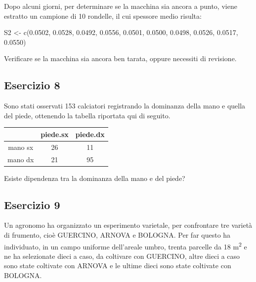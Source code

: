 \documentclass[a4paper,12pt,oneside]{book}
\newenvironment{Shaded}{\begin{snugshade}}{\end{snugshade}}
\newcommand{\FloatTok}[1]{#1}
\newcommand{\OtherTok}[1]{#1}
\newcommand{\FunctionTok}[1]{#1}
\newcommand{\NormalTok}[1]{#1}
\begin{document}
Dopo alcuni giorni, per determinare se la macchina sia ancora a punto, viene estratto un campione di 10 rondelle, il cui spessore medio risulta:

\begin{Shaded}
\begin{Highlighting}[]
\NormalTok{S2 }\OtherTok{\textless{}{-}} \FunctionTok{c}\NormalTok{(}\FloatTok{0.0502}\NormalTok{, }\FloatTok{0.0528}\NormalTok{, }\FloatTok{0.0492}\NormalTok{, }\FloatTok{0.0556}\NormalTok{, }\FloatTok{0.0501}\NormalTok{, }\FloatTok{0.0500}\NormalTok{, }\FloatTok{0.0498}\NormalTok{,}
        \FloatTok{0.0526}\NormalTok{, }\FloatTok{0.0517}\NormalTok{, }\FloatTok{0.0550}\NormalTok{)}
\end{Highlighting}
\end{Shaded}

Verificare se la macchina sia ancora ben tarata, oppure necessiti di revisione.

\hypertarget{esercizio-8-1}{%
\subsection{Esercizio 8}\label{esercizio-8-1}}

Sono stati osservati 153 calciatori registrando la dominanza della mano e quella del piede, ottenendo la tabella riportata qui di seguito.

\begin{longtable}[]{@{}ccc@{}}
\toprule()
& piede.sx & piede.dx \\
\midrule()
\endhead
mano sx & 26 & 11 \\
mano dx & 21 & 95 \\
\bottomrule()
\end{longtable}

Esiste dipendenza tra la dominanza della mano e del piede?

\hypertarget{esercizio-9-1}{%
\subsection{Esercizio 9}\label{esercizio-9-1}}

Un agronomo ha organizzato un esperimento varietale, per confrontare tre varietà di frumento, cioè GUERCINO, ARNOVA e BOLOGNA. Per far questo ha individuato, in un campo uniforme dell'areale umbro, trenta parcelle da 18 m\textsuperscript{2} e ne ha selezionate dieci a caso, da coltivare con GUERCINO, altre dieci a caso sono state coltivate con ARNOVA e le ultime dieci sono state coltivate con BOLOGNA.
\end{document}
